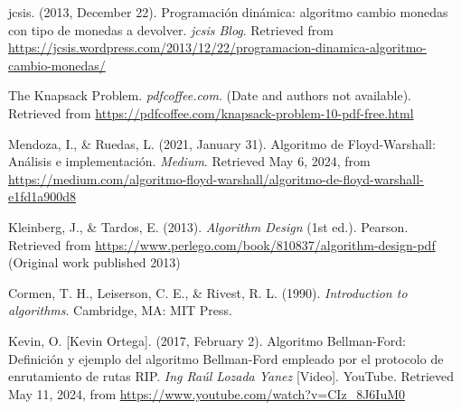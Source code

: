 \begin{thebibliography}{9}

    jcsis. (2013, December 22). Programación dinámica: algoritmo cambio monedas con tipo de monedas a devolver. \textit{jcsis Blog}. Retrieved from \url{https://jcsis.wordpress.com/2013/12/22/programacion-dinamica-algoritmo-cambio-monedas/}
    
    The Knapsack Problem. \textit{pdfcoffee.com}. (Date and authors not available). Retrieved from \url{https://pdfcoffee.com/knapsack-problem-10-pdf-free.html}
    
    Mendoza, I., \& Ruedas, L. (2021, January 31). Algoritmo de Floyd-Warshall: Análisis e implementación. \textit{Medium}. Retrieved May 6, 2024, from \url{https://medium.com/algoritmo-floyd-warshall/algoritmo-de-floyd-warshall-e1fd1a900d8}
    
    Kleinberg, J., \& Tardos, E. (2013). \textit{Algorithm Design} (1st ed.). Pearson. Retrieved from \url{https://www.perlego.com/book/810837/algorithm-design-pdf} (Original work published 2013)
    
    Cormen, T. H., Leiserson, C. E., \& Rivest, R. L. (1990). \textit{Introduction to algorithms}. Cambridge, MA: MIT Press.
    
    Kevin, O. [Kevin Ortega]. (2017, February 2). Algoritmo Bellman-Ford: Definición y ejemplo del algoritmo Bellman-Ford empleado por el protocolo de enrutamiento de rutas RIP. \textit{Ing Raúl Lozada Yanez} [Video]. YouTube. Retrieved May 11, 2024, from \url{https://www.youtube.com/watch?v=CIz_8J6IuM0}
    
    \end{thebibliography}
    